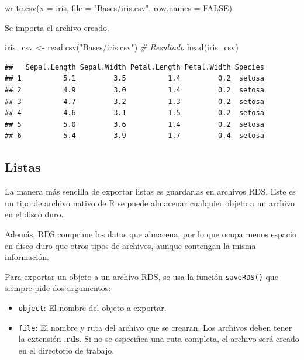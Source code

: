 \documentclass[
]{book}
\newenvironment{Shaded}{\begin{snugshade}}{\end{snugshade}}
\newcommand{\AttributeTok}[1]{\textcolor[rgb]{0.77,0.63,0.00}{#1}}
\newcommand{\CommentTok}[1]{\textcolor[rgb]{0.56,0.35,0.01}{\textit{#1}}}
\newcommand{\ConstantTok}[1]{\textcolor[rgb]{0.00,0.00,0.00}{#1}}
\newcommand{\FunctionTok}[1]{\textcolor[rgb]{0.00,0.00,0.00}{#1}}
\newcommand{\NormalTok}[1]{#1}
\newcommand{\OtherTok}[1]{\textcolor[rgb]{0.56,0.35,0.01}{#1}}
\newcommand{\StringTok}[1]{\textcolor[rgb]{0.31,0.60,0.02}{#1}}
\providecommand{\tightlist}{%
  \setlength{\itemsep}{0pt}\setlength{\parskip}{0pt}}
\begin{document}
\begin{Shaded}
\begin{Highlighting}[]
\FunctionTok{write.csv}\NormalTok{(}\AttributeTok{x =}\NormalTok{ iris, }\AttributeTok{file =} \StringTok{"Bases/iris.csv"}\NormalTok{, }\AttributeTok{row.names =} \ConstantTok{FALSE}\NormalTok{) }
\end{Highlighting}
\end{Shaded}

Se importa el archivo creado.

\begin{Shaded}
\begin{Highlighting}[]
\NormalTok{iris\_csv }\OtherTok{\textless{}{-}} \FunctionTok{read.csv}\NormalTok{(}\StringTok{"Bases/iris.csv"}\NormalTok{)}
\CommentTok{\# Resultado}
\FunctionTok{head}\NormalTok{(iris\_csv)}
\end{Highlighting}
\end{Shaded}

\begin{verbatim}
##   Sepal.Length Sepal.Width Petal.Length Petal.Width Species
## 1          5.1         3.5          1.4         0.2  setosa
## 2          4.9         3.0          1.4         0.2  setosa
## 3          4.7         3.2          1.3         0.2  setosa
## 4          4.6         3.1          1.5         0.2  setosa
## 5          5.0         3.6          1.4         0.2  setosa
## 6          5.4         3.9          1.7         0.4  setosa
\end{verbatim}

\hypertarget{listas-2}{%
\subsection{Listas}\label{listas-2}}

La manera más sencilla de exportar listas es guardarlas en archivos RDS. Este es un tipo de archivo nativo de R se puede almacenar cualquier objeto a un archivo en el disco duro.

Además, RDS comprime los datos que almacena, por lo que ocupa menos espacio en disco duro que otros tipos de archivos, aunque contengan la misma información.

Para exportar un objeto a un archivo RDS, se usa la función \texttt{saveRDS()} que siempre pide dos argumentos:

\begin{itemize}
\tightlist
\item
  \texttt{object}: El nombre del objeto a exportar.
\item
  \texttt{file}: El nombre y ruta del archivo que se crearan. Los archivos deben tener la extensión \textbf{.rds}. Si no se especifica una ruta completa, el archivo será creado en el directorio de trabajo.
\end{itemize}
\end{document}

